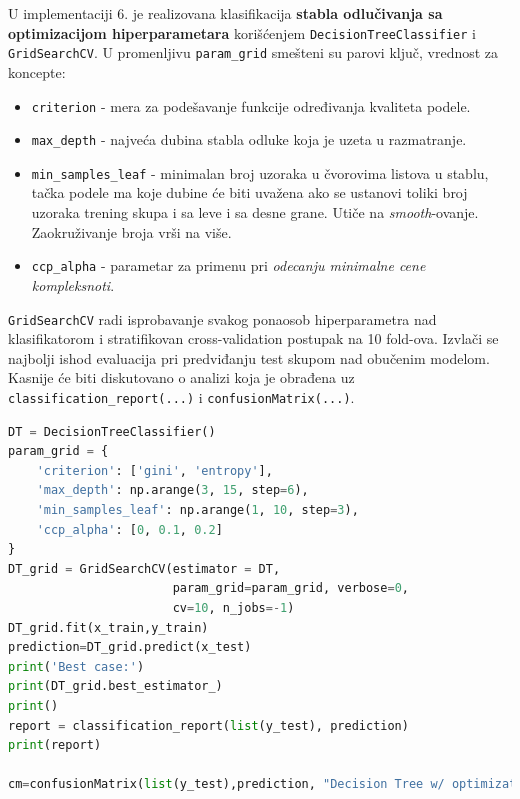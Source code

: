 \documentclass[fontsize=12bp, paper=a4]{scrarticle}
\begin{document}
U implementaciji 6. je realizovana klasifikacija \textbf{stabla odlučivanja sa optimizacijom hiperparametara} korišćenjem \verb|DecisionTreeClassifier|\cite{DT} i \verb|GridSearchCV|. U promenljivu \verb|param_grid| smešteni su parovi ključ, vrednost za koncepte:
\begin{itemize}
    \item \verb|criterion| - mera za podešavanje funkcije određivanja kvaliteta podele.
    \item \verb|max_depth| - najveća dubina stabla odluke koja je uzeta u razmatranje.
    \item \verb|min_samples_leaf| - minimalan broj uzoraka u čvorovima listova u stablu, tačka podele ma koje dubine će biti uvažena ako se ustanovi toliki broj uzoraka trening skupa i sa leve i sa desne grane. Utiče na \textit{smooth}-ovanje. Zaokruživanje broja vrši na više.
    \item \verb|ccp_alpha| - parametar za primenu pri \textit{odecanju minimalne cene kompleksnoti}.
\end{itemize} 
\verb*|GridSearchCV| radi isprobavanje svakog ponaosob hiperparametra nad klasifikatorom i stratifikovan cross-validation postupak na 10 fold-ova. Izvlači se najbolji ishod evaluacija pri predviđanju test skupom nad obučenim modelom. Kasnije će biti diskutovano o analizi koja je obrađena uz \verb|classification_report(...)| i \verb|confusionMatrix(...)|.
\begin{lstlisting}[language=Python, caption=Stablo odlučivanja sa optimizacijama hiperparametara.]
DT = DecisionTreeClassifier()
param_grid = {
    'criterion': ['gini', 'entropy'],
    'max_depth': np.arange(3, 15, step=6),
    'min_samples_leaf': np.arange(1, 10, step=3),
    'ccp_alpha': [0, 0.1, 0.2]  
}
DT_grid = GridSearchCV(estimator = DT,
                       param_grid=param_grid, verbose=0,
                       cv=10, n_jobs=-1)
DT_grid.fit(x_train,y_train)
prediction=DT_grid.predict(x_test)
print('Best case:')
print(DT_grid.best_estimator_)
print()
report = classification_report(list(y_test), prediction)
print(report)

cm=confusionMatrix(list(y_test),prediction, "Decision Tree w/ optimization")

\end{lstlisting}
\end{document}

